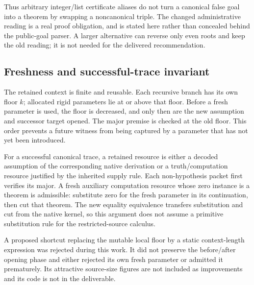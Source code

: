 Thus arbitrary integer/list certificate aliases do not turn a canonical
false goal into a theorem by swapping a noncanonical triple. The changed
administrative reading is a real proof obligation, and is stated here
rather than concealed behind the public-goal parser. A larger alternative
can reverse only even roots and keep the old reading; it is not needed
for the delivered recommendation.

\subsection{Freshness and successful-trace invariant}

The retained context is finite and reusable. Each recursive branch has
its own floor $k$; allocated rigid parameters lie at or above that floor.
Before a fresh parameter is used, the floor is decreased, and only then
are the new assumption and successor target opened. The major premise
is checked at the old floor. This order prevents a future witness from
being captured by a parameter that has not yet been introduced.

For a successful canonical trace, a retained resource is either a decoded
assumption of the corresponding native derivation or a truth/computation
resource justified by the inherited supply rule. Each non-hypothesis
packet first verifies its major. A fresh auxiliary computation resource
whose zero instance is a theorem is admissible: substitute zero for the
fresh parameter in its continuation, then cut that theorem. The new
equality equivalence transfers substitution and cut from the native
kernel, so this argument does not assume a primitive substitution rule
for the restricted-source calculus.

A proposed shortcut replacing the mutable local floor by a static
context-length expression was rejected during this work. It did not
preserve the before/after opening phase and either rejected its own
fresh parameter or admitted it prematurely. Its attractive source-size
figures are not included as improvements and its code is not in the
deliverable.
